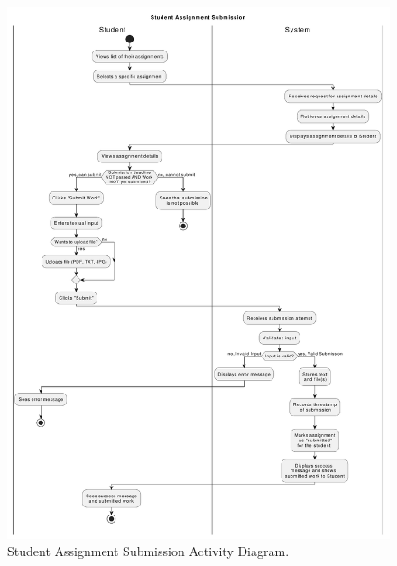 \begin{figure}[h]
    \centering
    \includegraphics[width=1\linewidth]{SRS/imgs/3_StudentSubmissionAD.pdf}
    \caption{Student Assignment Submission Activity Diagram.}
    \label{fig:StudentAssignmentAD}
\end{figure}
\vspace*{\fill}
\clearpage

\vspace*{\fill}
